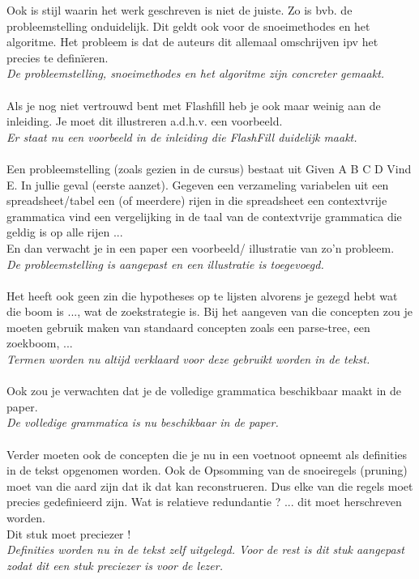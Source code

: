 \documentclass{article}
\begin{document}
Ook is stijl waarin het werk geschreven is niet de juiste. Zo is bvb. de probleemstelling onduidelijk. Dit geldt ook voor de snoeimethodes en het algoritme. Het probleem is dat de auteurs dit allemaal omschrijven ipv het precies te defin\"ieren. \\
\textit{De probleemstelling, snoeimethodes en het algoritme zijn concreter gemaakt.} \\ \\ 

Als je nog niet vertrouwd bent met Flashfill heb je ook maar weinig aan de inleiding. Je moet dit illustreren a.d.h.v. een voorbeeld. \\
\textit{Er staat nu een voorbeeld in de inleiding die FlashFill duidelijk maakt.} \\ \\

Een probleemstelling (zoals gezien in de cursus) bestaat uit Given A B C D Vind E. In jullie geval (eerste aanzet). Gegeven een verzameling variabelen uit een spreadsheet/tabel een (of meerdere) rijen in die spreadsheet een contextvrije grammatica vind een vergelijking in de taal van de contextvrije grammatica die geldig is op alle rijen ... \\En dan verwacht je in een paper een voorbeeld/ illustratie van zo’n probleem.\\
\textit{De probleemstelling is aangepast en een illustratie is toegevoegd.} \\ \\

Het heeft ook geen zin die hypotheses op te lijsten alvorens je gezegd hebt wat die boom is ...,
wat de zoekstrategie is. Bij het aangeven van die concepten zou je moeten gebruik maken van standaard concepten zoals een parse-tree, een zoekboom, ... \\
\textit{Termen worden nu altijd verklaard voor deze gebruikt worden in de tekst.} \\ \\ 

Ook zou je verwachten dat je de volledige grammatica beschikbaar maakt in de paper. \\
\textit{De volledige grammatica is nu beschikbaar in de paper.} \\ \\

Verder moeten ook de concepten die je nu in een voetnoot opneemt als definities in de tekst
opgenomen worden. Ook de Opsomming van de snoeiregels (pruning) moet van die aard zijn dat ik dat kan reconstrueren. Dus elke van die regels moet precies gedefinieerd zijn. Wat is relatieve redundantie ? ... dit moet herschreven worden. \\
Dit stuk moet preciezer ! \\
\textit{Definities worden nu in de tekst zelf uitgelegd. Voor de rest is dit stuk aangepast zodat dit een stuk preciezer is voor de lezer.} \\ \\
\end{document}
